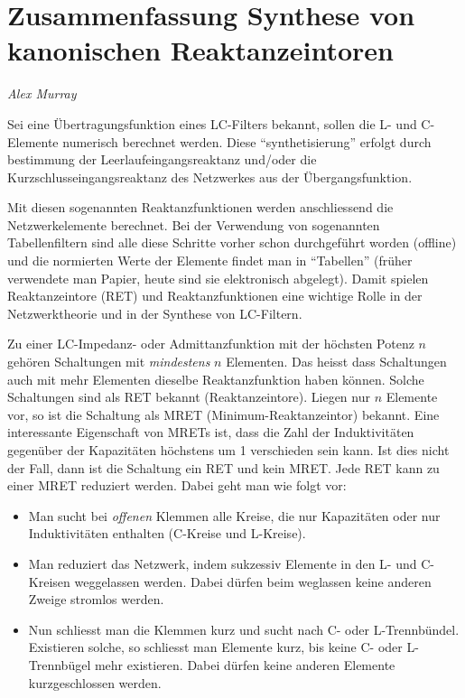 \documentclass[notitlepage]{fhnwreport/fhnwreport}
\begin{document}
\section*{Zusammenfassung Synthese von kanonischen Reaktanzeintoren}
\hfill \textit{Alex Murray}

Sei eine  \"Ubertragungsfunktion  eines  LC-Filters bekannt, sollen die L- und
C-Elemente numerisch berechnet werden. Diese ``synthetisierung'' erfolgt durch
bestimmung        der       Leerlaufeingangsreaktanz       und/oder        die
Kurzschlusseingangsreaktanz  des  Netzwerkes  aus   der   \"Ubergangsfunktion.

Mit   diesen   sogenannten   Reaktanzfunktionen   werden   anschliessend   die
Netzwerkelemente berechnet. Bei der Verwendung von sogenannten Tabellenfiltern
sind alle diese Schritte vorher schon durchgef\"uhrt worden  (offline) und die
normierten Werte der Elemente findet  man in ``Tabellen'' (fr\"uher verwendete
man   Papier,   heute   sind   sie   elektronisch  abgelegt).  Damit   spielen
Reaktanzeintore  (RET)  und  Reaktanzfunktionen  eine  wichtige  Rolle  in der
Netzwerktheorie und in der Synthese von LC-Filtern.

Zu einer LC-Impedanz-  oder  Admittanzfunktion  mit  der h\"ochsten Potenz $n$
geh\"oren Schaltungen mit \textit{mindestens}  $n$  Elementen. Das heisst dass
Schaltungen auch mit mehr Elementen dieselbe  Reaktanzfunktion haben k\"onnen.
Solche Schaltungen sind als  RET  bekannt  (Reaktanzeintore).  Liegen  nur $n$
Elemente vor,  so ist die Schaltung als MRET (Minimum-Reaktanzeintor) bekannt.
Eine   interessante   Eigenschaft   von   MRETs   ist,   dass   die  Zahl  der
Induktivit\"aten gegen\"uber der  Kapazit\"aten  h\"ochstens  um 1 verschieden
sein kann. Ist dies  nicht  der  Fall, dann ist die Schaltung ein RET und kein
MRET. Jede RET kann zu einer MRET reduziert werden. Dabei geht  man  wie folgt
vor:

\begin{itemize}
\item  Man  sucht   bei   \textit{offenen}   Klemmen   alle  Kreise,  die  nur
Kapazit\"aten oder  nur  Induktivit\"aten  enthalten  (C-Kreise und L-Kreise).
\item Man reduziert das Netzwerk,  indem  sukzessiv  Elemente  in  den  L- und
C-Kreisen  weggelassen werden. Dabei d\"urfen  beim  weglassen  keine  anderen
Zweige stromlos werden.
\item   Nun   schliesst  man  die  Klemmen  kurz  und  sucht  nach   C-   oder
L-Trennb\"undel.  Existieren solche, so schliesst man Elemente kurz, bis keine
C- oder L-Trennb\"ugel mehr  existieren. Dabei d\"urfen keine anderen Elemente
kurzgeschlossen werden.
\end{itemize}
\end{document}
